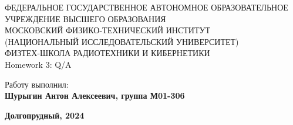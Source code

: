 \begin{center}
    {\small ФЕДЕРАЛЬНОЕ ГОСУДАРСТВЕННОЕ АВТОНОМНОЕ ОБРАЗОВАТЕЛЬНОЕ\\ УЧРЕЖДЕНИЕ ВЫСШЕГО ОБРАЗОВАНИЯ\\ МОСКОВСКИЙ ФИЗИКО-ТЕХНИЧЕСКИЙ ИНСТИТУТ\\ (НАЦИОНАЛЬНЫЙ ИССЛЕДОВАТЕЛЬСКИЙ УНИВЕРСИТЕТ)\\ ФИЗТЕХ-ШКОЛА РАДИОТЕХНИКИ И КИБЕРНЕТИКИ}\\
    \hfill \break
    \hfill \break
    \hfill \break
    \Huge{Homework 3: Q/A}\\
  \end{center}

  \hfill \break
  \hfill \break
  \hfill \break
  \hfill \break
  \hfill \break
  \hfill \break

  \begin{flushright}
    \normalsize{Работу выполнил:}\\
    \normalsize{\textbf{Шурыгин Антон Алексеевич, группа М01-306}}\\
  \end{flushright}

  \begin{center}
    \normalsize{\textbf{Долгопрудный, 2024}}
  \end{center}


  \thispagestyle{empty} %


  \newpage
  \thispagestyle{plain}
  \tableofcontents
  \thispagestyle{plain}
  \newpage
